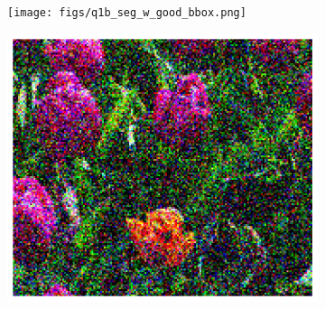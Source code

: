 \documentclass[11pt]{article}
\begin{document}
\begin{figure}[H]
    \centering
    \begin{subfigure}[c]{.6\textwidth}  %
        \centering
        \texttt{[image: figs/q1b\_seg\_w\_good\_bbox.png]}
        \caption{}  %
        \label{fig:q1b_zoomed}
    \end{subfigure}%
    \begin{minipage}[c]{.35\textwidth}  %
        \begin{subfigure}{\textwidth}
            \centering
            \includegraphics[width=\linewidth]{figs/q1b_zoomed_region1.png}
            \caption{}  %
            \label{fig:q1b_zoomed_bad}
        \end{subfigure}\\[1ex]  %
        \begin{subfigure}{\textwidth}
            \centering

\end{subfigure}
\end{minipage}
\end{figure}
\end{document}
